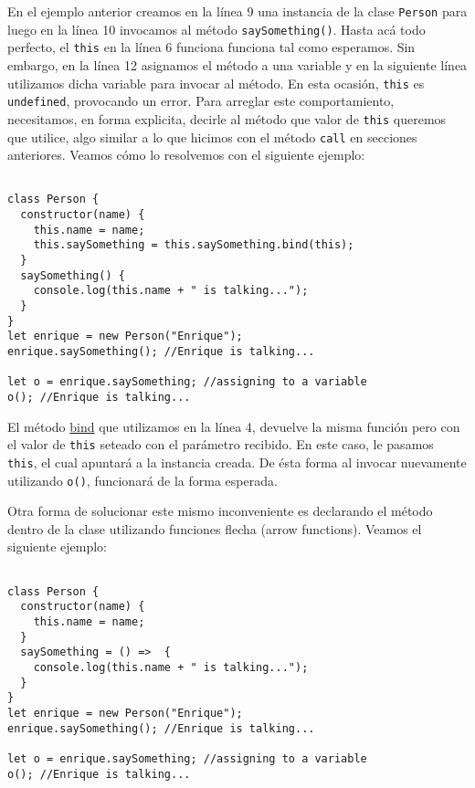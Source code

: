 \documentclass[a4paper, oneside, titlepage, 12pt]{paper}
\begin{document}
En el ejemplo anterior creamos en la línea 9 una instancia de la clase \texttt{Person} para luego en la línea 10 invocamos al método \texttt{saySomething()}. Hasta acá todo perfecto, el \texttt{this} en la línea 6 funciona funciona tal como esperamos. Sin embargo, en la línea 12 asignamos el método a una variable y en la siguiente línea utilizamos dicha variable para invocar al método. En esta ocasión, \texttt{this} es \texttt{undefined}, provocando un error. Para arreglar este comportamiento, necesitamos, en forma explicita, decirle al método que valor de \texttt{this} queremos que utilice, algo similar a lo que hicimos con el método \texttt{call} en secciones anteriores. Veamos cómo lo resolvemos con el siguiente ejemplo:
 
\begin{verbatim}

class Person {
  constructor(name) {
    this.name = name;
    this.saySomething = this.saySomething.bind(this);    
  }
  saySomething() {
    console.log(this.name + " is talking...");
  }
}
let enrique = new Person("Enrique");
enrique.saySomething(); //Enrique is talking...

let o = enrique.saySomething; //assigning to a variable
o(); //Enrique is talking...
\end{verbatim}

El método \href{https://developer.mozilla.org/es/docs/Web/JavaScript/Reference/Global_Objects/Function/bind}{bind} que utilizamos en la línea 4, devuelve la misma función pero con el valor de \texttt{this} seteado con el parámetro recibido. En este caso, le pasamos \texttt{this}, el cual apuntará a la instancia creada. De ésta forma al invocar nuevamente utilizando \texttt{o()}, funcionará de la forma esperada.
\newline

Otra forma de solucionar este mismo inconveniente es declarando el método dentro de la clase utilizando funciones flecha (arrow functions). Veamos el siguiente ejemplo:

\begin{verbatim}

class Person {
  constructor(name) {
    this.name = name;
  }
  saySomething = () =>  {
    console.log(this.name + " is talking...");
  }
}
let enrique = new Person("Enrique");
enrique.saySomething(); //Enrique is talking...

let o = enrique.saySomething; //assigning to a variable
o(); //Enrique is talking...
\end{verbatim}
\end{document}
